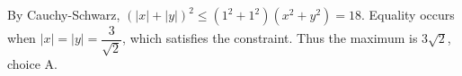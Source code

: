 By Cauchy-Schwarz, $(|x|+|y|)^2\le(1^2+1^2)(x^2+y^2)=18$. Equality occurs when $|x|=|y|=\dfrac{3}{\sqrt2}$, which satisfies the constraint. Thus the maximum is $\boxed{3\sqrt2}$, choice A.
